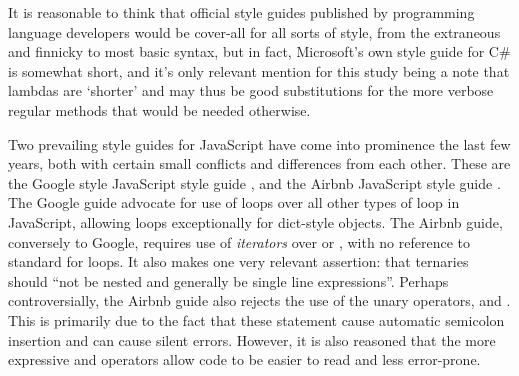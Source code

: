 \documentclass{article}
\begin{document}
        It is reasonable to think that official style guides published by programming language developers would be cover-all for all sorts of style, from the extraneous and finnicky to most basic syntax, but in fact, Microsoft's own style guide for C\# is somewhat short, and it's only relevant mention for this study being a note that lambdas are `shorter' and may thus be good substitutions for the more verbose regular methods that would be needed otherwise.

        Two prevailing style guides for JavaScript have come into prominence the last few years, both with certain small conflicts and differences from each other. These are the Google style JavaScript style guide \citep{googleJSStyle}, and the Airbnb JavaScript style guide \citep{airbnbJSStyle}. The Google guide advocate for use of  loops over all other types of  loop in JavaScript, allowing  loops exceptionally for dict-style objects. The Airbnb guide, conversely to Google, requires use of \emph{iterators} over  or , with no reference to standard for loops. It also makes one very relevant assertion: that ternaries should ``not be nested and generally be single line expressions''. Perhaps controversially, the Airbnb guide also rejects the use of the unary operators, \codeword{++} and \codeword{--}. This is primarily due to the fact that these statement cause automatic semicolon insertion and can cause silent errors. However, it is also reasoned that the more expressive \codeword{+=} and \codeword{-=} operators allow code to be easier to read and less error-prone.
\end{document}

